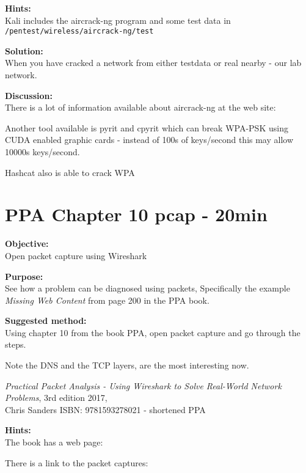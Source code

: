\documentclass[a4paper,11pt,notitlepage]{report}
\begin{document}
{\bf Hints:}\\
Kali includes the aircrack-ng program and some test data in \\
\verb+/pentest/wireless/aircrack-ng/test+

{\bf Solution:}\\
When you have cracked a network from either testdata or real nearby - our lab network.

{\bf Discussion:}\\
There is a lot of information available about aircrack-ng at the web site:\\

Another tool available is pyrit and cpyrit which can break WPA-PSK using CUDA enabled graphic cards - instead of 100s of keys/second this may allow 10000s keys/second.

Hashcat also is able to crack WPA 



\chapter{PPA Chapter 10 pcap - 20min}
\label{ex:espn-capture}


{\bf Objective:}\\
Open packet capture using Wireshark

{\bf Purpose:}\\
See how a problem can be diagnosed using packets, Specifically the example \emph{Missing Web Content} from page 200 in the PPA book.

{\bf Suggested method:}\\
Using chapter 10 from the book PPA, open packet capture and go through the steps.

Note the DNS and the TCP layers, are the most interesting now.

\emph{Practical Packet Analysis - Using Wireshark to Solve Real-World Network Problems}, 3rd edition 2017, \\
Chris Sanders ISBN: 9781593278021 - shortened PPA

{\bf Hints:}\\
The book has a web page:\\

There is a link to the packet captures:\\
\end{document}
